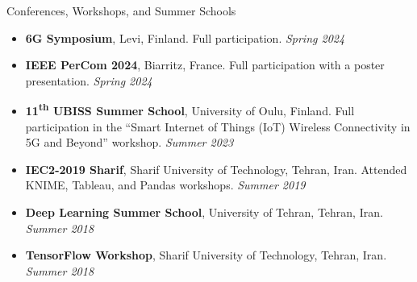 \documentclass{resume}
\begin{document}
\begin{rSection}{Conferences, Workshops, and Summer Schools}
\begin{itemize}
    \item {\bf 6G Symposium}, Levi, Finland. Full participation. {\em Spring 2024}

    \item {\bf IEEE PerCom 2024}, Biarritz, France. Full participation with a poster presentation. {\em Spring 2024}

    \item {\bf 11\textsuperscript{th} UBISS Summer School}, University of Oulu, Finland. Full participation in the ``Smart Internet of Things (IoT) Wireless Connectivity in 5G and Beyond'' workshop. {\em Summer 2023}

    \item {\bf IEC2-2019 Sharif}, Sharif University of Technology, Tehran, Iran. Attended KNIME, Tableau, and Pandas workshops. {\em Summer 2019}

    \item {\bf Deep Learning Summer School}, University of Tehran, Tehran, Iran. {\em Summer 2018}

    \item {\bf TensorFlow Workshop}, Sharif University of Technology, Tehran, Iran. {\em Summer 2018}

\end{itemize}

\end{rSection}

\end{document}
